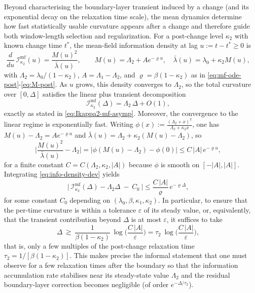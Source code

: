 \documentclass{article}
\theoremstyle{plain}
\theoremstyle{definition}
\newcommand{\1}{\mathbf{1}}
\begin{document}
    Beyond characterising the boundary-layer transient induced by a change (and its exponential decay on the relaxation time scale), the mean dynamics determine how fast statistically usable curvature appears after a change and therefore guide both window-length selection and regularization. For a post-change level $\kappa_2$ with known change time $t^\ast$, the mean-field information density at lag $u:=t-t^\ast\ge0$ is
    \[
    \frac{d}{du}\,\mathcal I_{\kappa_2}^{\mathrm{mf}}(u)
    =\frac{M(u)^2}{\bar\lambda(u)},
    \qquad
    M(u)=\Lambda_2+A e^{-\varrho u},\quad
    \bar\lambda(u)=\lambda_0+\kappa_2 M(u),
    \]
    with $\Lambda_2=\lambda_0/(1-\kappa_2)$, $A=\Lambda_1-\Lambda_2$, and $\varrho=\beta(1-\kappa_2)$ as in \eqref{eq:mf-ode-post}-\eqref{eq:M-post}. As $u$ grows, this density converges to $\Lambda_2$, so the total curvature over $[0,\Delta]$ satisfies the linear  plus  transient decomposition
    \[
    \mathcal I_{\kappa_2}^{\mathrm{mf}}(\Delta)=\Lambda_2\,\Delta+O(1),
    \]
    exactly as stated in \eqref{eq:Ikappa2-mf-asymp}. Moreover, the convergence to the linear regime is exponentially fast. Writing $\phi(x):=\frac{(\Lambda_2+x)^2}{\Lambda_2+\kappa_2 x}$, one has $M(u)-\Lambda_2=A e^{-\varrho u}$ and $\bar\lambda(u)=\Lambda_2+\kappa_2(M(u)-\Lambda_2)$, so
    \begin{equation}
    \label{eq:info-density-dev}
    \bigg|\frac{M(u)^2}{\bar\lambda(u)}-\Lambda_2\bigg|
    =\big|\phi(M(u)-\Lambda_2)-\phi(0)\big|
    \le C\,|A|\,e^{-\varrho u},
    \end{equation}
    for a finite constant $C=C(\Lambda_2,\kappa_2,|A|)$ because $\phi$ is smooth on $[-|A|,|A|]$. Integrating \eqref{eq:info-density-dev} yields
    \begin{equation}
    \label{eq:info-transient-tail}
    \big|\ \mathcal I_{\kappa_2}^{\mathrm{mf}}(\Delta)-\Lambda_2\Delta\ -\ C_0\ \big|
    \le \frac{C\,|A|}{\varrho}\,e^{-\varrho\Delta},
    \end{equation}
    for some constant $C_0$ depending on $(\lambda_0,\beta,\kappa_1,\kappa_2)$. In particular, to ensure that the per-time curvature is within a tolerance $\varepsilon$ of its steady value, or, equivalently, that the transient contribution beyond $\Delta$ is at most $\varepsilon$, it suffices to take
    \[
    \Delta\ \gtrsim\ \frac{1}{\beta(1-\kappa_2)}\ \log\!\Big(\frac{C\,|A|}{\varepsilon}\Big)
    =\tau_2\ \log\!\Big(\frac{C\,|A|}{\varepsilon}\Big),
    \]
    that is, only a few multiples of the post-change relaxation time $\tau_2=1/[\beta(1-\kappa_2)]$. This makes precise the informal statement that one must observe for a few relaxation times after the boundary so that the information accumulation rate stabilises near its steady-state value $\Lambda_2$ and the residual boundary-layer correction becomes negligible (of order $e^{-\Delta/\tau_2}$).
\end{document}

